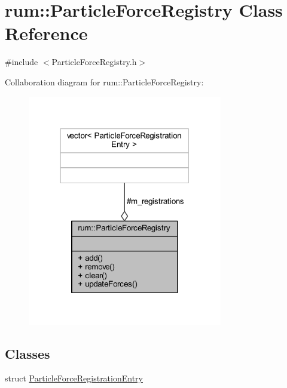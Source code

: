 \hypertarget{classrum_1_1_particle_force_registry}{}\section{rum\+:\+:Particle\+Force\+Registry Class Reference}
\label{classrum_1_1_particle_force_registry}


{\ttfamily \#include $<$Particle\+Force\+Registry.\+h$>$}



Collaboration diagram for rum\+:\+:Particle\+Force\+Registry\+:\nopagebreak
\begin{figure}[H]
\begin{center}
\leavevmode
\includegraphics[width=241pt]{classrum_1_1_particle_force_registry__coll__graph}
\end{center}
\end{figure}
\subsection*{Classes}
\begin{DoxyCompactItemize}
\item 
struct \mbox{\hyperlink{structrum_1_1_particle_force_registry_1_1_particle_force_registration_entry}{Particle\+Force\+Registration\+Entry}}
\end{DoxyCompactItemize}
